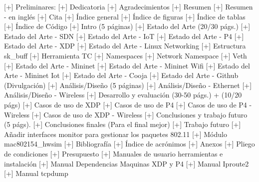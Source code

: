 [+] Preliminares:
    [+] Dedicatoria
    [+] Agradecimientos
    [+] Resumen
    [+] Resumen - en inglés
    [+] Cita
[+] Índice general
[+] Índice de figuras
[+] Índice de tablas
[+] Índice de Código 
[+] Intro (5 páginas)
[+] Estado del Arte (20/30 págs.)
    [+] Estado del Arte - SDN
    [+] Estado del Arte - IoT
    [+] Estado del Arte - P4
    [+] Estado del Arte - XDP
    [+] Estado del Arte - Linux Networking
        [+] Estructura sk_buff
        [+] Herramienta TC
        [+] Namespaces
        [+] Network Namespace
        [+] Veth
    [+] Estado del Arte - Mininet 
    [+] Estado del Arte - Mininet Wifi
    [+] Estado del Arte - Mininet Iot
    [+] Estado del Arte - Cooja 
    [+] Estado del Arte - Github (Divulgación)
[+] Análisis/Diseño (5 páginas)
    [+] Análisis/Diseño - Ethernet
    [+] Análisis/Diseño - Wireless
[+] Desarrollo y evaluación (30-50 págs.) + (10/20 págs)
    [+] Casos de uso de XDP
    [+] Casos de uso de P4
    [+] Casos de uso de P4 - Wireless
    [+] Casos de uso de XDP - Wireless
[+] Conclusiones y trabajo futuro (5 págs).
    [+] Conclusiones finales (Para el final mejor)
    [+] Trabajo futuro
        [+] Añadir interfaces monitor para gestionar los paquetes 802.11
        [+] Módulo mac802154_hwsim
[+] Bibliografía
[+] Índice de acrónimos
[+] Anexos
    [+] Pliego de condiciones 
    [+] Presupuesto
    [+] Manuales de usuario herramientas e instalación
        [+] Manual Dependencias Maquinas XDP y P4
        [+] Manual Iproute2
        [+] Manual tcpdump
